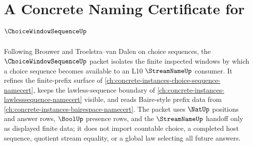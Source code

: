 \chapter{A Concrete Naming Certificate for $\ChoiceWindowSequenceUp$}
\label{ch:concrete-instances-choice-window-sequence-namecert}

Following Brouwer and Troelstra--van Dalen on choice sequences, the $\ChoiceWindowSequenceUp$ packet isolates the finite inspected windows by which a choice sequence becomes available to an L10 $\StreamNameUp$ consumer. It refines the finite-prefix surface of \autoref{ch:concrete-instances-choice-sequence-namecert}, keeps the lawless-sequence boundary of \autoref{ch:concrete-instances-lawlesssequence-namecert} visible, and reads Baire-style prefix data from \autoref{ch:concrete-instances-bairespace-namecert}. The packet uses $\NatUp$ positions and answer rows, $\BoolUp$ presence rows, and the $\StreamNameUp$ handoff only as displayed finite data; it does not import countable choice, a completed host sequence, quotient stream equality, or a global law selecting all future answers.

